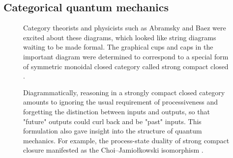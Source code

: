 \subsection{Categorical quantum mechanics}

\begin{figure}[h!]
\centering
{}
\caption{Category theorists and physicists such as Abramsky and Baez were excited about these diagrams, which looked like string diagrams waiting to be made formal. The graphical cups and caps in the important diagram were determined to correspond to a special form of symmetric monoidal closed category called strong compact closed \citep{abramsky_abstract_2009}.}
\end{figure}

\begin{figure}[h!]
\centering
{}
\caption{Diagrammatically, reasoning in a strongly compact closed category amounts to ignoring the usual requirement of processiveness and forgetting the distinction between inputs and outputs, so that "future" outputs could curl back and be "past" inputs. This formulation also gave insight into the structure of quantum mechanics. For example, the process-state duality of strong compact closure manifested as the Choi–Jamiołkowski isomorphism \citep{choi_completely_1975,jamiolkowski_linear_1972}.}
\end{figure}

